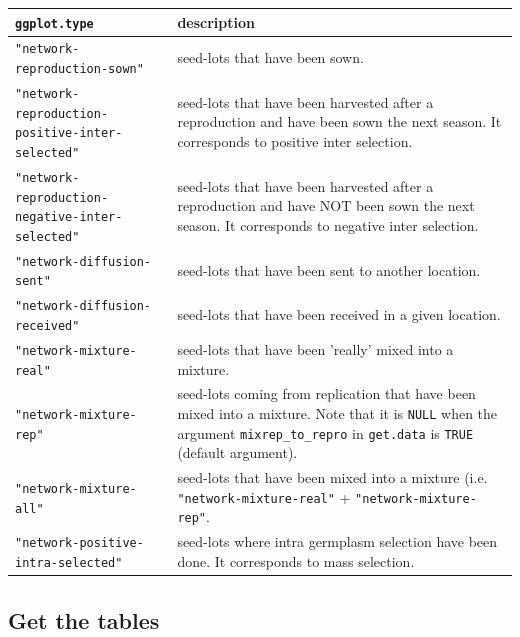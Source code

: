 \documentclass{article}\usepackage[]{graphicx}\usepackage[]{color}
\begin{document}
\begin{center}
\begin{tabular}{ p{} p{} }
\hline
\texttt{ggplot.type} & description \\
\hline

\texttt{"network-reproduction-sown"} & seed-lots that have been sown. \\

\texttt{"network-reproduction-positive-inter-selected"} & seed-lots that have been harvested after a reproduction and have been sown the next season.
It corresponds to positive inter selection. \\

\texttt{"network-reproduction-negative-inter-selected"} & seed-lots that have been harvested after a reproduction and have NOT been sown the next season.
It corresponds to negative inter selection. \\

\texttt{"network-diffusion-sent"} & seed-lots that have been sent to another location. \\

\texttt{"network-diffusion-received"} & seed-lots that have been received in a given location. \\

\texttt{"network-mixture-real"} & seed-lots that have been 'really' mixed into a mixture. \\

\texttt{"network-mixture-rep"} & seed-lots coming from replication that have been mixed into a mixture. Note that it is \texttt{NULL} when the argument \texttt{mixrep\_to\_repro} in \texttt{get.data} is \texttt{TRUE} (default argument).\\

\texttt{"network-mixture-all"} & seed-lots that have been mixed into a mixture (i.e. \texttt{"network-mixture-real"} + \texttt{"network-mixture-rep"}. \\

\texttt{"network-positive-intra-selected"} & seed-lots where intra germplasm selection have been done.
It corresponds to mass selection. \\

\hline
\end{tabular}
\end{center}


\subsection{Get the tables}
\end{document}
